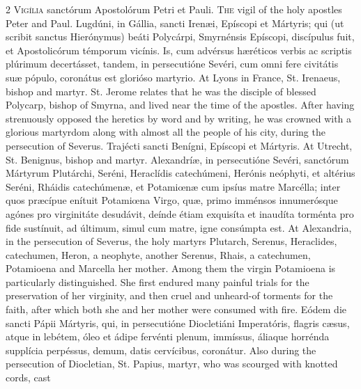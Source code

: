 \begin{paracol}{2}
\lettrine[lines=1]{V}{igília} sanctórum 
 Apostolórum Petri et Pauli.
\switchcolumn
{}
\lettrine[lines=1]{T}{he} vigil of the holy apostles Peter 
 and Paul.
\switchcolumn*
{}
Lugdúni, in Gállia, 
 sancti Irenæi, Epíscopi et Mártyris; qui (ut scribit sanctus Hierónymus) 
 beáti Polycárpi, Smyrnénsis Epíscopi, discípulus fuit, et Apostolicórum 
 témporum vicínis. Is, cum advérsus hæréticos verbis ac scriptis 
 plúrimum decertásset, tandem, in persecutióne Sevéri, cum omni fere 
 civitátis suæ pópulo, coronátus est glorióso martyrio.
\switchcolumn
{}
At Lyons in France, St. Irenaeus, 
 bishop and martyr. St. Jerome relates that he was the disciple of 
 blessed Polycarp, bishop of Smyrna, and lived near the time of the apostles. 
 After having strenuously opposed the heretics by word and by writing, he was 
 crowned with a glorious martyrdom along with almost all the people of his 
 city, during the persecution of Severus.
\switchcolumn*
{}
Trajécti sancti Benígni, 
 Epíscopi et Mártyris.
\switchcolumn
{}
At Utrecht, St. Benignus, bishop and 
 martyr.
\switchcolumn*
{}
Alexandríæ, in 
 persecutióne Sevéri, sanctórum Mártyrum Plutárchi, Seréni, Heraclídis 
 catechúmeni, Herónis neóphyti, et altérius Seréni, Rháidis catechúmenæ, et 
 Potamiœnæ cum ipsíus matre Marcélla; inter quos præcípue enítuit Potamiœna 
 Virgo, quæ, primo imménsos innumerósque agónes pro virginitáte desudávit, 
 deínde étiam exquisíta et inaudíta torménta pro fide sustínuit, ad últimum, 
 simul cum matre, igne consúmpta est.
\switchcolumn
{}
At Alexandria, in the persecution of 
 Severus, the holy martyrs Plutarch, Serenus, Heraclides, catechumen, Heron, 
 a neophyte, another Serenus, Rhais, a catechumen, Potamioena and Marcella 
 her mother. Among them the virgin Potamioena is particularly 
 distinguished. She first endured many painful trials for the 
 preservation of her virginity, and then cruel and unheard-of torments for 
 the faith, after which both she and her mother were consumed with fire.
\switchcolumn*
{}
Eódem die sancti Pápii 
 Mártyris, qui, in persecutióne Diocletiáni Imperatóris, flagris cæsus, atque 
 in lebétem, óleo et ádipe fervénti plenum, immíssus, áliaque horrénda 
 supplícia perpéssus, demum, datis cervícibus, coronátur.
\switchcolumn
{}
Also during the persecution of 
 Diocletian, St. Papius, martyr, who was scourged with knotted cords, cast 

\end{paracol}
